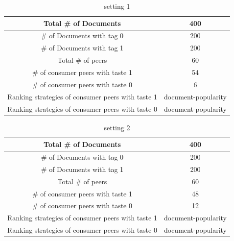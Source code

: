 \documentclass [12pt]{article} \usepackage{multicol}
\begin{document}
\begin{table}[h!]
\caption{setting 1}
\begin{center}


\begin{tabular}{|c|c|}
\hline

Total \# of Documents &  400  \\ \hline
\# of Documents with tag 0 &  200  \\ \hline
\# of Documents with tag 1 &  200  \\ \hline

Total \# of peers & 60 \\ \hline

\# of consumer peers with taste 1  & 54 \\ \hline 
\# of consumer peers with taste 0  &  6\\ \hline

Ranking strategies of consumer peers with taste 1  & document-popularity \\ \hline 
Ranking strategies of consumer peers with taste 0  &  document-popularity\\ \hline


\end{tabular}

\end{center}
\label{default}
\end{table}



\begin{table}[h!]
\caption{setting 2}
\begin{center}


\begin{tabular}{|c|c|}
\hline

Total \# of Documents &  400  \\ \hline
\# of Documents with tag 0 &  200  \\ \hline
\# of Documents with tag 1 &  200  \\ \hline

Total \# of peers & 60 \\ \hline
\# of consumer peers with taste 1  &  48 \\ \hline 
\# of consumer peers with taste 0  &  12 \\ \hline

Ranking strategies of consumer peers with taste 1  & document-popularity \\ \hline 
Ranking strategies of consumer peers with taste 0  &  document-popularity\\ \hline

\end{tabular}

\end{center}
\label{default}
\end{table}
\end{document}
